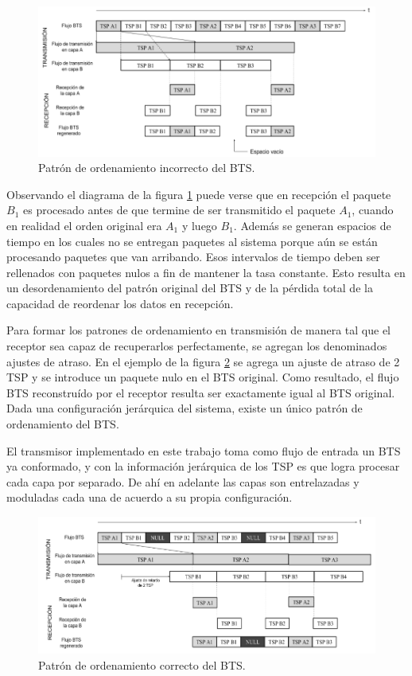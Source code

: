 \begin{figure}[h!]
	\centering
	\includegraphics[scale=0.45]{figuras/cap02/bts1}
	\caption{\label{f:bts1} Patrón de ordenamiento incorrecto del BTS.}
\end{figure} 

Observando el diagrama de la figura \ref{f:bts1} puede verse que en recepción el paquete $B_1$ es procesado antes de que termine de ser transmitido el paquete $A_1$, cuando en realidad el orden original era $A_1$ y luego $B_1$. Además se generan espacios de tiempo en los cuales no se entregan paquetes al sistema porque aún se están procesando paquetes que van arribando. Esos intervalos de tiempo deben ser rellenados con paquetes nulos a fin de mantener la tasa constante. Esto resulta en un desordenamiento del patrón original del BTS y de la pérdida total de la capacidad de reordenar los datos en recepción.

Para formar los patrones de ordenamiento en transmisión de manera tal que el receptor sea capaz de recuperarlos perfectamente, se agregan los denominados ajustes de atraso. En el ejemplo de la figura \ref{f:bts2} se agrega un ajuste de atraso de 2 TSP y se introduce un paquete nulo en el BTS original. Como resultado, el flujo BTS reconstruído por el receptor resulta ser exactamente igual al BTS original. Dada una configuración jerárquica del sistema, existe un único patrón de ordenamiento del BTS.

El transmisor implementado en este trabajo toma como flujo de entrada un BTS ya conformado, y con la información jerárquica de los TSP es que logra procesar cada capa por separado. De ahí en adelante las capas son entrelazadas y moduladas cada una de acuerdo a su propia configuración.

\begin{figure}[h!]
	\centering
	\includegraphics[scale=0.45]{figuras/cap02/bts2}
	\caption{\label{f:bts2} Patrón de ordenamiento correcto del BTS.}
\end{figure}